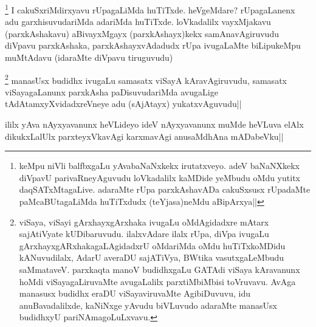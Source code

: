 \begin{artha}
\footnote[1]{keMpu niVli balfbxgaLu yAvabaNaNxkekx irutatxveyo. adeV baNaNXkekx diVpavU parivaRneyAguvudu loVkadalilx kaMDide yeMbudu oMdu yutitx daqSATxMtagaLive. adaraMte rUpa parxkAshavADa cakuSxsusx rUpadaMte paMcaBUtagaLiMda huTiTxdudx (teYjasa)neMdu aBipArxya||} I cakuSxriMdirxyavu rUpagaLiMda huTiTxde. heVgeMdare? rUpagaLanenx adu garxhisuvudariMda adariMda huTiTxde. loVkadalilx vayxMjakavu (parxkAshakavu) aBivayxMgayx (parxkAshayx)kekx samAnavAgiruvudu diVpavu parxkAshaka, parxkAshayxvAdadudx rUpa ivugaLaMte biLipukeMpu muMtAdavu (idaraMte diVpavu tiruguvudu)
\end{artha}


\begin{artha}
\footnote[1]{viSaya, viSayi gArxhayxgArxhaka ivugaLu oMdAgidadxre mAtarx sajAtiVyate kUDibaruvudu. ilalxvAdare ilalx rUpa, diVpa ivugaLu gArxhayxgARxhakagaLAgidadxrU oMdariMda oMdu huTiTxkoMDidu kANuvudilalx, AdarU averaDU sajATiVya, BWtika vasutxgaLeMbudu saMmataveV. parxkaqta manoV budidhxgaLu GATAdi viSaya kAravanunx hoMdi viSayagaLiruvaMte avugaLalilx parxtiMbiMbisi toVruvavu. AvAga manasusx budidhx eraDU viSayaviruvaMte AgibiDuvuvu, idu anuBavadalilxde, kaNiNxge yAvudu biVLuvudo adaraMte manasUsx budidhxyU pariNAmagoLuLxvavu.} manasUsx budidhx ivugaLu samasatx viSayA kAravAgiruvudu, samasatx viSayagaLanunx parxkAsha paDisuvudariMda avugaLige tAdAtamxyXvidadxreVneye adu (sAjAtayx) yukatxvAguvudu||
\end{artha}


\begin{artha}
ililx yAva nAyxyavanunx heVLideyo ideV nAyxyavanunx muMde heVLuva elAlx dikukxLalUlx parxteyxVkavAgi karxmavAgi anusaMdhAna mADabeVku||
\end{artha}


